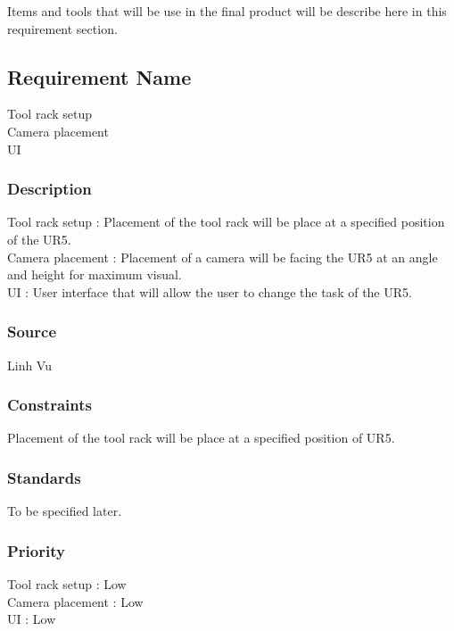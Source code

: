 Items and tools that will be use in the final product will be describe here in this requirement section.

\subsection{Requirement Name}
Tool rack setup
\\Camera placement
\\UI
\subsubsection{Description}
Tool rack setup : Placement of the tool rack will be place at a specified position of the UR5.
\\Camera placement : Placement of a camera will be facing the UR5 at an angle and height for maximum visual.
\\UI : User interface that will allow the user to change the task of the UR5.
\subsubsection{Source}
Linh Vu
\subsubsection{Constraints}
Placement of the tool rack will be place at a specified position of UR5.
\subsubsection{Standards}
To be specified later.
\subsubsection{Priority}
Tool rack setup : Low
\\Camera placement : Low
\\UI : Low